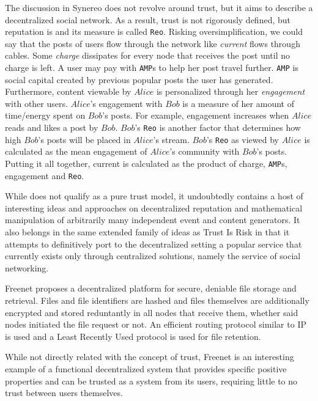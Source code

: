   The discussion in Synereo \cite{synereo} does not revolve around trust, but it aims to describe a decentralized social
  network. As a result, trust is not rigorously defined, but reputation is and its measure is called \texttt{Reo}. Risking
  oversimplification, we could say that the posts of users flow through the network like \textit{current} flows through
  cables. Some \textit{charge} dissipates for every node that receives the post until no charge is left. A user may pay with
  \texttt{AMP}s to help her post travel further. \texttt{AMP} is social capital created by previous popular posts the user
  has generated. Furthermore, content viewable by $Alice$ is personalized through her \textit{engagement} with other users.
  $Alice$'s engagement with $Bob$ is a measure of her amount of time/energy spent on $Bob$'s posts. For example, engagement
  increases when $Alice$ reads and likes a post by $Bob$. $Bob$'s \texttt{Reo} is another factor that determines how high
  $Bob$'s posts will be placed in $Alice$'s stream. $Bob$'s \texttt{Reo} as viewed by $Alice$ is calculated as the mean
  engagement of $Alice$'s community with $Bob$'s posts. Putting it all together, current is calculated as the product of
  charge, \texttt{AMP}s, engagement and \texttt{Reo}.

  While \cite{synereo} does not qualify as a pure trust model, it undoubtedly contains a host of interesting ideas and
  approaches on decentralized reputation and mathematical manipulation of arbitrarily many independent event and content
  generators. It also belongs in the same extended family of ideas as Trust Is Risk in that it attempts to definitively
  port to the decentralized setting a popular service that currently exists only through centralized solutions, namely the
  service of social networking.

  Freenet \cite{freenet} proposes a decentralized platform for secure, deniable file storage and retrieval. Files and file
  identifiers are hashed and files themselves are additionally encrypted and stored reduntantly in all nodes that receive
  them, whether said nodes initiated the file request or not. An efficient routing protocol similar to IP is used and a Least
  Recently Used protocol is used for file retention.

  While not directly related with the concept of trust, Freenet is an interesting example of a functional decentralized
  system that provides specific positive properties and can be trusted as a system from its users, requiring little to no
  trust between users themselves.

